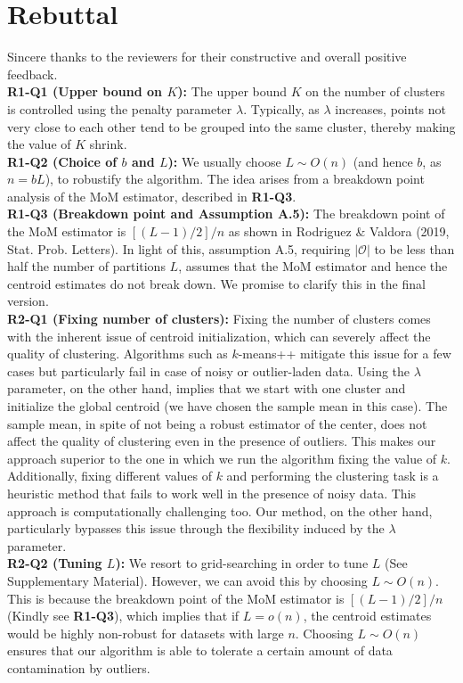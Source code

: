 \documentclass{article}
\begin{document}
\section*{Rebuttal}
Sincere thanks to the reviewers for their constructive and overall positive feedback.\\
\textbf{R1-Q1 (Upper bound on $K$):} The upper bound $K$ on the number of clusters is controlled using the penalty parameter $\lambda$. Typically, as $\lambda$ increases, points not very close to each other tend to be grouped into the same cluster, thereby making the value of $K$ shrink.\\
\textbf{R1-Q2 (Choice of $b$ and $L$):} We usually choose $L\sim O(n)$ (and hence $b$, as $n=bL$), to robustify the algorithm. The idea arises from a breakdown point analysis of the MoM estimator, described in \textbf{R1-Q3}.\\
\textbf{R1-Q3 (Breakdown point and Assumption A.5):} The breakdown point of the MoM estimator is $[(L-1)/2]/n$ as shown in Rodriguez \& Valdora (2019, Stat. Prob. Letters). In light of this, assumption A.5, requiring $|\mathcal{O}|$ to be less than half the number of partitions $L$, assumes that the MoM estimator and hence the centroid estimates do not break down. We promise to clarify this in the final version.\\
\textbf{R2-Q1 (Fixing number of clusters):} Fixing the number of clusters comes with the inherent issue of centroid initialization, which can severely affect the quality of clustering. Algorithms such as $k$-means++ mitigate this issue for a few cases but particularly fail in case of noisy or outlier-laden data. Using the $\lambda$ parameter, on the other hand, implies that we start with one cluster and initialize the global centroid (we have chosen the sample mean in this case). The sample mean, in spite of not being a robust estimator of the center, does not affect the quality of clustering even in the presence of outliers. This makes our approach superior to the one in which we run the algorithm fixing the value of $k$. Additionally, fixing different values of $k$ and performing the clustering task is a heuristic method that fails to work well in the presence of noisy data. This approach is computationally challenging too. Our method, on the other hand, particularly bypasses this issue through the flexibility induced by the $\lambda$ parameter.\\
\textbf{R2-Q2 (Tuning $L$):} We resort to grid-searching in order to tune $L$ (See Supplementary Material). However, we can avoid this by choosing $L\sim O(n)$. This is because the breakdown point of the MoM estimator is $[(L-1)/2]/n$ (Kindly see \textbf{R1-Q3}), which implies that if $L=o(n)$, the centroid estimates would be highly non-robust for datasets with large $n$. Choosing $L\sim O(n)$ ensures that our algorithm is able to tolerate a certain amount of data contamination by outliers.\\
\end{document}
